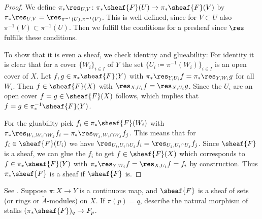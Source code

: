\begin{proof}
  We define $\pi_*\res_{U,V}\colon \pi_*\sheaf{F}(U)\rightarrow
  \pi_*\sheaf{F}(V)$ by $\pi_*\res_{U,V}=
  \res_{\pi^{-1}(U),\pi^{-1}(V)}$. This is well defined, since for
  $V\subset U$ also $\pi^{-1}(V)\subset \pi^{-1}(U)$. Then we fulfill
  the conditions for a presheaf since $\res$ fulfills these
  conditions.

  To show that it is even a sheaf, we check identity and glueability:
  For identity it is clear that for a cover $\{W_i\}_{i\in I}$ of $Y$
  the set $\{U_i\coloneqq \pi^{-1}(W_i)\}_{i\in I}$ is an open cover
  of $X$. Let $f,g\in \pi_*\sheaf{F}(Y)$ with $\pi_*\res_{Y,U_i}f=
  \pi_*\res_{Y,W_i}g$ for all $W_i$. Then $f\in \sheaf{F}(X)$ with
  $\res_{X,U_i}f= \res_{X,U_i}g$. Since the $U_i$ are an open cover $f
  = g \in \sheaf{F}(X)$ follows, which implies that $f=g \in
  \pi_*^{-1}\sheaf{F}(Y)$.

  For the gluability pick $f_i \in \pi_*\sheaf{F}(W_i)$ with
  $\pi_*\res_{W_i,W_i\cap W_j} f_i = \pi_*\res_{W_j,W_i\cap
    W_j}f_j$. This means that for $f_i\in \sheaf{F}(U_i)$ we have
  $\res_{U_i,U_i\cap U_j}f_i = \res_{U_j,U_i\cap U_j}f_j$. Since
  $\sheaf{F}$ is a sheaf, we can glue the $f_i$ to get $f\in
  \sheaf{F}(X)$ which corresponds to $f\in \pi_*\sheaf{F}(Y)$ with
  $\pi_*\res_{Y,W_i}f = \res_{X,U_i}f = f_i$ by construction.
  Thus $\pi_*\sheaf{F}$ is a sheaf if $\sheaf{F}$ is.
\end{proof}

\begin{exercise}[2.2.I]
  See \cite[2.2.I]{vakil2024the-rising-sea}.
  Suppose $\pi \colon X \rightarrow Y$ is a continuous map, and $\sheaf{F}$ is a sheaf of sets (or rings or $\ring{A}$-modules) on $X$. If $\pi(p) = q$, describe the natural morphism of stalks $(\pi_*\sheaf{F} )_q \rightarrow F_p$.
\end{exercise}

